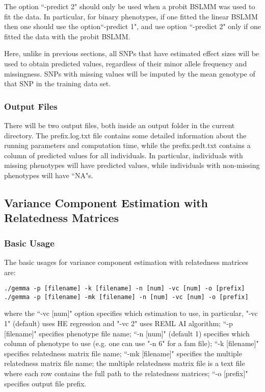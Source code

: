\documentclass[11pt]{article}
\begin{document}
The option ``-predict 2" should only be used when a probit BSLMM was used to fit the data. In particular, for binary phenotypes, if one fitted the linear BSLMM then one should use the option``-predict 1", and use option ``-predict 2" only if one fitted the data with the probit BSLMM. 

Here, unlike in previous sections, all SNPs that have estimated effect sizes will be used to obtain predicted values, regardless of their minor allele frequency and missingness. SNPs with missing values will be imputed by the mean genotype of that SNP in the training data set.

\subsubsection{Output Files}
There will be two output files, both inside an output folder in the current directory. The prefix.log.txt file contains some detailed information about the running parameters and computation time, while the prefix.prdt.txt contains a column of predicted values for all individuals. In particular, individuals with missing phenotypes will have predicted values, while individuals with non-missing phenotypes will have ``NA"s.







\subsection{Variance Component Estimation with Relatedness Matrices}
\subsubsection{Basic Usage}
The basic usages for variance component estimation with relatedness matrices are:
\begin{verbatim}
./gemma -p [filename] -k [filename] -n [num] -vc [num] -o [prefix]
./gemma -p [filename] -mk [filename] -n [num] -vc [num] -o [prefix]
\end{verbatim}
where the ``-vc [num]" option specifies which estimation to use, in particular, "-vc 1" (default) uses HE regression and "-vc 2" uses REML AI algorithm; ``-p [filename]" specifies phenotype file name; ``-n [num]" (default 1) specifies which column of phenotype to use (e.g. one can use "-n 6" for a fam file); ``-k [filename]" specifies relatedness matrix file name; ``-mk [filename]" specifies the multiple relatedness matrix file name; the multiple relatedness matrix file is a text file where each row contains the full path to the relatedness matrices; ``-o [prefix]" specifies output file prefix. 
\end{document}
